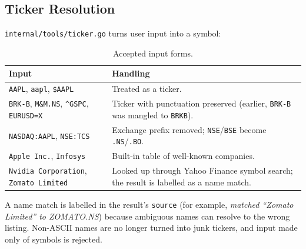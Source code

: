 \documentclass[12pt,a4paper,oneside]{report}
\begin{document}
\subsection{Ticker Resolution}
\texttt{internal/tools/ticker.go} turns user input into a symbol:
\begin{table}[H]\centering\small
\begin{tabularx}{\textwidth}{>{\raggedright\arraybackslash}p{5.4cm}X}
\toprule \textbf{Input} & \textbf{Handling}\\\midrule
\texttt{AAPL}, \texttt{aapl}, \texttt{\$AAPL} & Treated as a ticker.\\
\texttt{BRK-B}, \texttt{M\&M.NS}, \texttt{\^{}GSPC}, \texttt{EURUSD=X} & Ticker with punctuation preserved (earlier, \texttt{BRK-B} was mangled to \texttt{BRKB}).\\
\texttt{NASDAQ:AAPL}, \texttt{NSE:TCS} & Exchange prefix removed; \texttt{NSE}/\texttt{BSE} become \texttt{.NS}/\texttt{.BO}.\\
\texttt{Apple Inc.}, \texttt{Infosys} & Built-in table of well-known companies.\\
\texttt{Nvidia Corporation}, \texttt{Zomato Limited} & Looked up through Yahoo Finance symbol search; the result is labelled as a name match.\\
\bottomrule
\end{tabularx}
\caption{Accepted input forms.}
\label{tab:ticker}
\end{table}
A name match is labelled in the result's \texttt{source} (for example, \emph{matched ``Zomato Limited'' to ZOMATO.NS}) because ambiguous names can resolve to the wrong listing. Non-ASCII names are no longer turned into junk tickers, and input made only of symbols is rejected.
\end{document}
